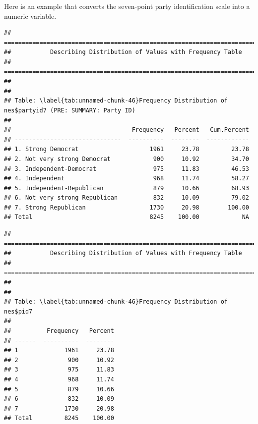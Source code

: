 \documentclass[
]{book}
\newenvironment{Shaded}{\begin{snugshade}}{\end{snugshade}}
\newcommand{\AttributeTok}[1]{\textcolor[rgb]{0.13,0.29,0.53}{#1}}
\newcommand{\CommentTok}[1]{\textcolor[rgb]{0.56,0.35,0.01}{\textit{#1}}}
\newcommand{\FunctionTok}[1]{\textcolor[rgb]{0.13,0.29,0.53}{\textbf{#1}}}
\newcommand{\NormalTok}[1]{#1}
\newcommand{\OtherTok}[1]{\textcolor[rgb]{0.56,0.35,0.01}{#1}}
\newcommand{\SpecialCharTok}[1]{\textcolor[rgb]{0.81,0.36,0.00}{\textbf{#1}}}
\begin{document}
Here is an example that converts the seven-point party identification scale into a numeric variable.

\begin{Shaded}
\end{Shaded}

\begin{verbatim}
## ===========================================================================
##           Describing Distribution of Values with Frequency Table
## ===========================================================================
## 
## 
## Table: \label{tab:unnamed-chunk-46}Frequency Distribution of nes$partyid7 (PRE: SUMMARY: Party ID)
## 
##                                  Frequency   Percent   Cum.Percent
## ------------------------------  ----------  --------  ------------
## 1. Strong Democrat                    1961     23.78         23.78
## 2. Not very strong Democrat            900     10.92         34.70
## 3. Independent-Democrat                975     11.83         46.53
## 4. Independent                         968     11.74         58.27
## 5. Independent-Republican              879     10.66         68.93
## 6. Not very strong Republican          832     10.09         79.02
## 7. Strong Republican                  1730     20.98        100.00
## Total                                 8245    100.00            NA
\end{verbatim}

\begin{Shaded}
\end{Shaded}

\begin{verbatim}
## ===========================================================================
##           Describing Distribution of Values with Frequency Table
## ===========================================================================
## 
## 
## Table: \label{tab:unnamed-chunk-46}Frequency Distribution of nes$pid7
## 
##          Frequency   Percent
## ------  ----------  --------
## 1             1961     23.78
## 2              900     10.92
## 3              975     11.83
## 4              968     11.74
## 5              879     10.66
## 6              832     10.09
## 7             1730     20.98
## Total         8245    100.00
\end{verbatim}
\end{document}
